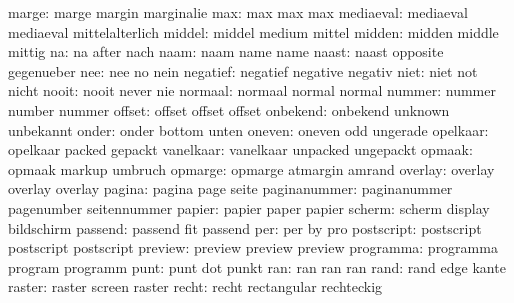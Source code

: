               marge:  marge                margin              marginalie
                max:  max                  max                 max
          mediaeval:  mediaeval            mediaeval           mittelalterlich
             middel:  middel               medium              mittel
             midden:  midden               middle              mittig
                 na:  na                   after               nach
               naam:  naam                 name                name
              naast:  naast                opposite            gegenueber
                nee:  nee                  no                  nein
           negatief:  negatief             negative            negativ
               niet:  niet                 not                 nicht
              nooit:  nooit                never               nie
            normaal:  normaal              normal              normal
             nummer:  nummer               number              nummer
             offset:  offset               offset              offset
           onbekend:  onbekend             unknown             unbekannt
              onder:  onder                bottom              unten
             oneven:  oneven               odd                 ungerade
           opelkaar:  opelkaar             packed              gepackt
          vanelkaar:  vanelkaar            unpacked            ungepackt  %
             opmaak:  opmaak               markup              umbruch
            opmarge:  opmarge              atmargin            amrand
            overlay:  overlay              overlay             overlay
             pagina:  pagina               page                seite
       paginanummer:  paginanummer         pagenumber          seitennummer
             papier:  papier               paper               papier
             scherm:  scherm               display             bildschirm
            passend:  passend              fit                 passend
                per:  per                  by                  pro
         postscript:  postscript           postscript          postscript
            preview:  preview              preview             preview %
          programma:  programma            program             programm
               punt:  punt                 dot                 punkt
                ran:  ran                  ran                 ran
               rand:  rand                 edge                kante
             raster:  raster               screen              raster
              recht:  recht                rectangular         rechteckig    
